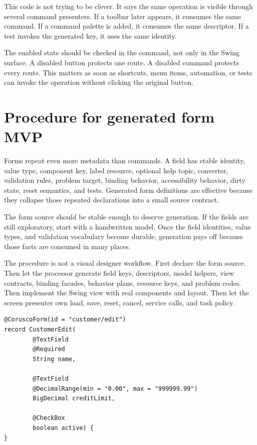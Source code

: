 This code is not trying to be clever. It says the same operation is visible through several command presenters. If a toolbar later appears, it consumes the same command. If a command palette is added, it consumes the same descriptor. If a test invokes the generated key, it uses the same identity.

The enabled state should be checked in the command, not only in the Swing surface. A disabled button protects one route. A disabled command protects every route. This matters as soon as shortcuts, menu items, automation, or tests can invoke the operation without clicking the original button.

\section{Procedure for generated form MVP}

Forms repeat even more metadata than commands. A field has stable identity, value type, component key, label resource, optional help topic, converter, validation rules, problem target, binding behavior, accessibility behavior, dirty state, reset semantics, and tests. Generated form definitions are effective because they collapse those repeated declarations into a small source contract.

The form source should be stable enough to deserve generation. If the fields are still exploratory, start with a handwritten model. Once the field identities, value types, and validation vocabulary become durable, generation pays off because those facts are consumed in many places.

The procedure is not a visual designer workflow. First declare the form source. Then let the processor generate field keys, descriptors, model helpers, view contracts, binding facades, behavior plans, resource keys, and problem codes. Then implement the Swing view with real components and layout. Then let the screen presenter own load, save, reset, cancel, service calls, and task policy.

\begin{lstlisting}[caption={A generated form source names editable facts.}]
@CoruscoForm(id = "customer/edit")
record CustomerEdit(
        @TextField
        @Required
        String name,

        @TextField
        @DecimalRange(min = "0.00", max = "999999.99")
        BigDecimal creditLimit,

        @CheckBox
        boolean active) {
}
\end{lstlisting}

